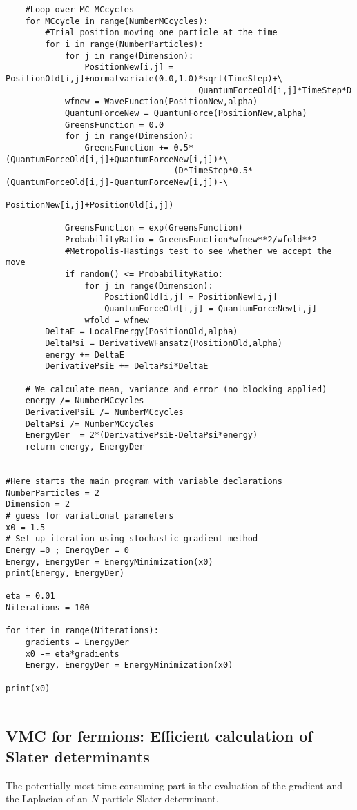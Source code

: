 \documentclass[%
oneside,                 %
final,                   %
10pt]{article}
\begin{document}
\begin{verbatim}
    #Loop over MC MCcycles
    for MCcycle in range(NumberMCcycles):
        #Trial position moving one particle at the time
        for i in range(NumberParticles):
            for j in range(Dimension):
                PositionNew[i,j] = PositionOld[i,j]+normalvariate(0.0,1.0)*sqrt(TimeStep)+\
                                       QuantumForceOld[i,j]*TimeStep*D
            wfnew = WaveFunction(PositionNew,alpha)
            QuantumForceNew = QuantumForce(PositionNew,alpha)
            GreensFunction = 0.0
            for j in range(Dimension):
                GreensFunction += 0.5*(QuantumForceOld[i,j]+QuantumForceNew[i,j])*\
	                              (D*TimeStep*0.5*(QuantumForceOld[i,j]-QuantumForceNew[i,j])-\
                                      PositionNew[i,j]+PositionOld[i,j])
      
            GreensFunction = exp(GreensFunction)
            ProbabilityRatio = GreensFunction*wfnew**2/wfold**2
            #Metropolis-Hastings test to see whether we accept the move
            if random() <= ProbabilityRatio:
                for j in range(Dimension):
                    PositionOld[i,j] = PositionNew[i,j]
                    QuantumForceOld[i,j] = QuantumForceNew[i,j]
                wfold = wfnew
        DeltaE = LocalEnergy(PositionOld,alpha)
        DeltaPsi = DerivativeWFansatz(PositionOld,alpha)
        energy += DeltaE
        DerivativePsiE += DeltaPsi*DeltaE
            
    # We calculate mean, variance and error (no blocking applied)
    energy /= NumberMCcycles
    DerivativePsiE /= NumberMCcycles
    DeltaPsi /= NumberMCcycles
    EnergyDer  = 2*(DerivativePsiE-DeltaPsi*energy)
    return energy, EnergyDer


#Here starts the main program with variable declarations
NumberParticles = 2
Dimension = 2
# guess for variational parameters
x0 = 1.5
# Set up iteration using stochastic gradient method
Energy =0 ; EnergyDer = 0
Energy, EnergyDer = EnergyMinimization(x0)
print(Energy, EnergyDer)

eta = 0.01
Niterations = 100

for iter in range(Niterations):
    gradients = EnergyDer
    x0 -= eta*gradients
    Energy, EnergyDer = EnergyMinimization(x0)

print(x0)


\end{verbatim}


\subsection*{VMC for fermions: Efficient calculation of Slater determinants}
The potentially most time-consuming part is the
evaluation of the gradient and the Laplacian of an $N$-particle  Slater
determinant. 
\end{document}
